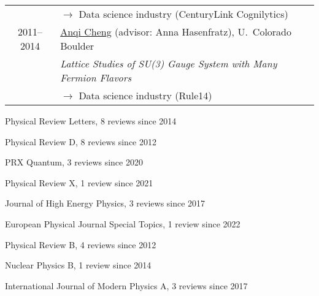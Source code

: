 \documentclass[10 pt]{article}
\renewcommand{\section}[2]%
    {\pagebreak[2]\vspace{1.3\baselineskip}%
     \hspace{0in}%
     \marginpar{
     \raggedright \scshape #1}#2}
\newenvironment{tightlist}
  {\begin{list} {} {\setlength{\topsep}{-8 pt} \setlength{\itemsep}{-3 pt} \setlength{\leftmargin}{0 mm}}}{\end{list}}
\newcommand{\blankline}{\quad\pagebreak[2]}
\newcommand{\spacer}{\blankline\vspace{12 pt}\blankline}
\newcommand{\lra}{\ensuremath{\longrightarrow} }
\begin{document}
\begin{tabular}[t]{cl}
                & \qquad \lra Data science industry (CenturyLink Cognilytics)                                                                       \\[6 pt]
  2011--2014    & \href{https://inspirehep.net/literature/1858863}{Anqi Cheng} (advisor: Anna Hasenfratz), U.~Colorado Boulder                      \\
                & \textit{Lattice Studies of SU(3) Gauge System with Many Fermion Flavors}                                                          \\
                & \qquad \lra Data science industry (Rule14)                                                                                        \\
\end{tabular}

\newpage



\section{Journal referee} %

\vspace{-12 pt} %
\begin{tightlist} %
  \item Physical Review Letters, 8 reviews since 2014
  \item Physical Review D, 8 reviews since 2012
  \item PRX Quantum, 3 reviews since 2020
  \item Physical Review X, 1 review since 2021
  \item Journal of High Energy Physics, 3 reviews since 2017
  \item European Physical Journal Special Topics, 1 review since 2022
  \item Physical Review B, 4 reviews since 2012
  \item Nuclear Physics B, 1 review since 2014
  \item International Journal of Modern Physics A, 3 reviews since 2017
\end{tightlist}

\spacer
\end{document}
